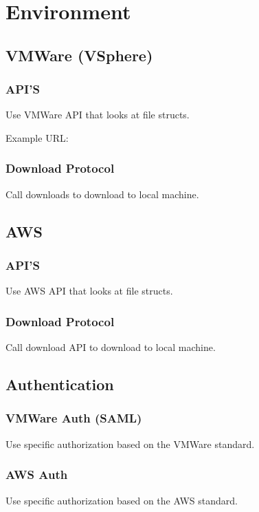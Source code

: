 \documentclass{article}
\begin{document}
    \section{Environment}

        \subsection{VMWare (VSphere)}

            \subsubsection{API'S}
            Use VMWare API that looks at file structs.

            Example URL:

            \subsubsection{Download Protocol}
            Call downloads to download to local machine.

        \subsection{AWS}
            \subsubsection{API'S}
            Use AWS API that looks at file structs.

            \subsubsection{Download Protocol}
            Call download API to download to local machine.

        \subsection{Authentication}
            \subsubsection{VMWare Auth (SAML)}
            Use specific authorization based on the VMWare standard.

            \subsubsection{AWS Auth}
            Use specific authorization based on the AWS standard.
\end{document}
